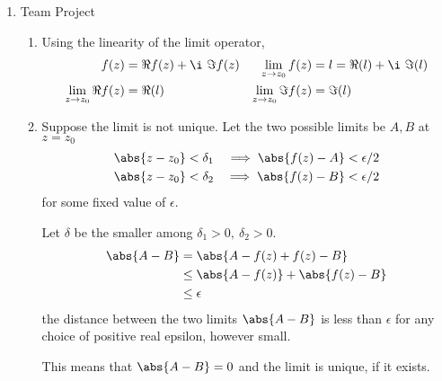 \begin{enumerate}
    \item Team Project
          \begin{enumerate}
              \item Using the linearity of the limit operator,
                    \begin{align}
                        f(z)                      & = \Re f(z)
                        + \i\ \Im f(z)            &
                        \lim_{z \to z_0} f(z)     & = l = \Re (l)
                        + \i\ \Im (l)                               \\
                        \lim_{z \to z_0} \Re f(z) & = \Re (l)     &
                        \lim_{z \to z_0} \Im f(z) & = \Im (l)       \\
                    \end{align}

              \item Suppose the limit is not unique. Let the two possible limits be
                    $ A, B $ at $ z = z_0 $
                    \begin{align}
                        \abs{z - z_0}           & < \delta_1   &
                        \implies \abs{f(z) - A} & < \epsilon/2   \\
                        \abs{z - z_0}           & < \delta_2   &
                        \implies \abs{f(z) - B} & < \epsilon/2
                    \end{align}
                    for some fixed value of $ \epsilon $. \par Let $ \delta $ be the
                    smaller among $ \delta_1 > 0,\ \delta_2 > 0 $.
                    \begin{align}
                        \abs{A - B} & = \abs{A - f(z) + f(z) - B}          \\
                                    & \leq \abs{A - f(z)} + \abs{f(z) - B} \\
                                    & \leq \epsilon
                    \end{align}
                    the distance between the two limits $ \abs{A - B} $ is less than
                    $ \epsilon $ for any choice of positive real epsilon, however small.
                    \par This means that $ \abs{A - B} = 0 $ and the limit is unique, if
                    it exists.


\end{enumerate}
\end{enumerate}
